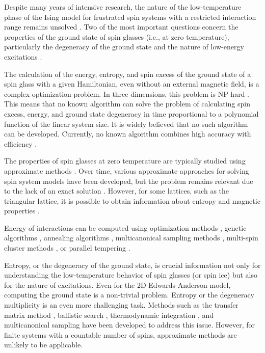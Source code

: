 \documentclass[preprint,12pt]{elsarticle}
\begin{document}
	Despite many years of intensive research, the nature of the low-temperature phase of the Ising model for frustrated spin systems with a restricted interaction range remains unsolved \cite{roma2010ground, newman2023proof}. Two of the most important questions concern the properties of the ground state of spin glasses (i.e., at zero temperature), particularly the degeneracy of the ground state and the nature of low-energy excitations \cite{newman2022ground}.
	
	The calculation of the energy, entropy, and spin excess of the ground state of a spin glass with a given Hamiltonian, even without an external magnetic field, is a complex optimization problem. In three dimensions, this problem is NP-hard \cite{barahona1982computational, hartmann2002optimization}. This means that no known algorithm can solve the problem of calculating spin excess, energy, and ground state degeneracy in time proportional to a polynomial function of the linear system size. It is widely believed that no such algorithm can be developed. Currently, no known algorithm combines high accuracy with efficiency \cite{fan2023searching}.
		
	The properties of spin glasses at zero temperature are typically studied using approximate methods \cite{roma2009ground, perez2012ground}. Over time, various approximate approaches for solving spin system models have been developed, but the problem remains relevant due to the lack of an exact solution \cite{rybin2022hybrid, makarova2023canonical, farias2024differentiable, jabar2024magnetic}. However, for some lattices, such as the triangular lattice, it is possible to obtain information about entropy and magnetic properties \cite{jurvcivsinova2024classical}.
	
	Energy of interactions can be computed using optimization methods \cite{hartmann2002optimization, hartmann2004new}, genetic algorithms \cite{holland1992adaptation}, annealing algorithms \cite{kirkpatrick1983optimization}, multicanonical sampling methods \cite{berg1994ground, shevchenko2017multicanonical}, multi-spin cluster methods \cite{makarova2023canonical}, or parallel tempering \cite{PhysRevB.50.16444, roma2009ground}.
	
	Entropy, or the degeneracy of the ground state, is crucial information not only for understanding the low-temperature behavior of spin glasses (or spin ice) but also for the nature of excitations. Even for the 2D Edwards-Anderson model, computing the ground state is a non-trivial problem. Entropy or the degeneracy multiplicity is an even more challenging task. Methods such as the transfer matrix method \cite{PhysRevB.22.288, cheung1983equilibrium, kolan1982ground}, ballistic search \cite{hartmann2000ground}, thermodynamic integration \cite{kirkpatrick1977frustration, binder1985monte, roma2004ground}, and multicanonical sampling \cite{berg1994ground, shevchenko2017multicanonical} have been developed to address this issue. However, for finite systems with a countable number of spins, approximate methods are unlikely to be applicable.  
	
\end{document}
